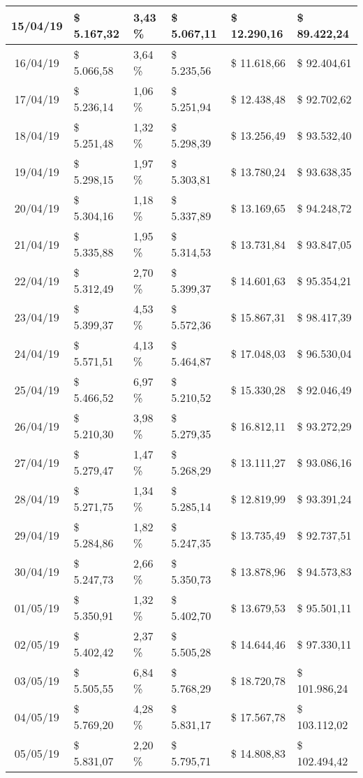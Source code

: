 \begin{small}
\begin{longtable}{|c|l|l|l|l|l|}
15/04/19 & \$ 5.167,32 & 3,43 \% & \$ 5.067,11 & \$ 12.290,16 & \$ 89.422,24 \\ \hline
16/04/19 & \$ 5.066,58 & 3,64 \% & \$ 5.235,56 & \$ 11.618,66 & \$ 92.404,61 \\ \hline
17/04/19 & \$ 5.236,14 & 1,06 \% & \$ 5.251,94 & \$ 12.438,48 & \$ 92.702,62 \\ \hline
18/04/19 & \$ 5.251,48 & 1,32 \% & \$ 5.298,39 & \$ 13.256,49 & \$ 93.532,40 \\ \hline
19/04/19 & \$ 5.298,15 & 1,97 \% & \$ 5.303,81 & \$ 13.780,24 & \$ 93.638,35 \\ \hline
20/04/19 & \$ 5.304,16 & 1,18 \% & \$ 5.337,89 & \$ 13.169,65 & \$ 94.248,72 \\ \hline
21/04/19 & \$ 5.335,88 & 1,95 \% & \$ 5.314,53 & \$ 13.731,84 & \$ 93.847,05 \\ \hline
22/04/19 & \$ 5.312,49 & 2,70 \% & \$ 5.399,37 & \$ 14.601,63 & \$ 95.354,21 \\ \hline
23/04/19 & \$ 5.399,37 & 4,53 \% & \$ 5.572,36 & \$ 15.867,31 & \$ 98.417,39 \\ \hline
24/04/19 & \$ 5.571,51 & 4,13 \% & \$ 5.464,87 & \$ 17.048,03 & \$ 96.530,04 \\ \hline
25/04/19 & \$ 5.466,52 & 6,97 \% & \$ 5.210,52 & \$ 15.330,28 & \$ 92.046,49 \\ \hline
26/04/19 & \$ 5.210,30 & 3,98 \% & \$ 5.279,35 & \$ 16.812,11 & \$ 93.272,29 \\ \hline
27/04/19 & \$ 5.279,47 & 1,47 \% & \$ 5.268,29 & \$ 13.111,27 & \$ 93.086,16 \\ \hline
28/04/19 & \$ 5.271,75 & 1,34 \% & \$ 5.285,14 & \$ 12.819,99 & \$ 93.391,24 \\ \hline
29/04/19 & \$ 5.284,86 & 1,82 \% & \$ 5.247,35 & \$ 13.735,49 & \$ 92.737,51 \\ \hline
30/04/19 & \$ 5.247,73 & 2,66 \% & \$ 5.350,73 & \$ 13.878,96 & \$ 94.573,83 \\ \hline
01/05/19 & \$ 5.350,91 & 1,32 \% & \$ 5.402,70 & \$ 13.679,53 & \$ 95.501,11 \\ \hline
02/05/19 & \$ 5.402,42 & 2,37 \% & \$ 5.505,28 & \$ 14.644,46 & \$ 97.330,11 \\ \hline
03/05/19 & \$ 5.505,55 & 6,84 \% & \$ 5.768,29 & \$ 18.720,78 & \$ 101.986,24 \\ \hline
04/05/19 & \$ 5.769,20 & 4,28 \% & \$ 5.831,17 & \$ 17.567,78 & \$ 103.112,02 \\ \hline
05/05/19 & \$ 5.831,07 & 2,20 \% & \$ 5.795,71 & \$ 14.808,83 & \$ 102.494,42 \\ \hline

\end{longtable}
\end{small}
